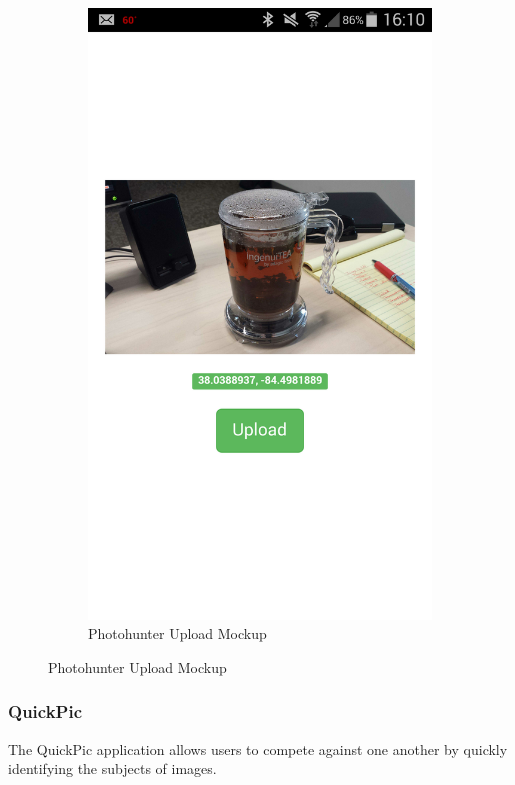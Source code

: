 \documentclass{article}
\begin{document}
\begin{figure}
\begin{subfigure}[b]{0.49\textwidth}
    \includegraphics[width=\textwidth]{photohunter/submit}
    \caption{Photohunter Upload Mockup}
  \end{subfigure}
\end{figure}

\subsubsection{QuickPic}
The QuickPic application allows users to compete against one another by
quickly identifying the subjects of images.
\end{document}
